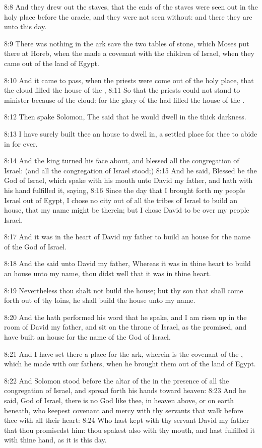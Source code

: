8:8 And they drew out the staves, that the ends of the staves were seen out in the holy place before the oracle, and they were not seen without: and there they are unto this day.

8:9 There was nothing in the ark save the two tables of stone, which Moses put there at Horeb, when the \LORD made a covenant with the children of Israel, when they came out of the land of Egypt.

8:10 And it came to pass, when the priests were come out of the holy place, that the cloud filled the house of the \LORD, 8:11 So that the priests could not stand to minister because of the cloud: for the glory of the \LORD had filled the house of the \LORD.

8:12 Then spake Solomon, The \LORD said that he would dwell in the thick darkness.

8:13 I have surely built thee an house to dwell in, a settled place for thee to abide in for ever.

8:14 And the king turned his face about, and blessed all the congregation of Israel: (and all the congregation of Israel stood;) 8:15 And he said, Blessed be the \LORD God of Israel, which spake with his mouth unto David my father, and hath with his hand fulfilled it, saying, 8:16 Since the day that I brought forth my people Israel out of Egypt, I chose no city out of all the tribes of Israel to build an house, that my name might be therein; but I chose David to be over my people Israel.

8:17 And it was in the heart of David my father to build an house for the name of the \LORD God of Israel.

8:18 And the \LORD said unto David my father, Whereas it was in thine heart to build an house unto my name, thou didst well that it was in thine heart.

8:19 Nevertheless thou shalt not build the house; but thy son that shall come forth out of thy loins, he shall build the house unto my name.

8:20 And the \LORD hath performed his word that he spake, and I am risen up in the room of David my father, and sit on the throne of Israel, as the \LORD promised, and have built an house for the name of the \LORD God of Israel.

8:21 And I have set there a place for the ark, wherein is the covenant of the \LORD, which he made with our fathers, when he brought them out of the land of Egypt.

8:22 And Solomon stood before the altar of the \LORD in the presence of all the congregation of Israel, and spread forth his hands toward heaven: 8:23 And he said, \LORD God of Israel, there is no God like thee, in heaven above, or on earth beneath, who keepest covenant and mercy with thy servants that walk before thee with all their heart: 8:24 Who hast kept with thy servant David my father that thou promisedst him: thou spakest also with thy mouth, and hast fulfilled it with thine hand, as it is this day.

